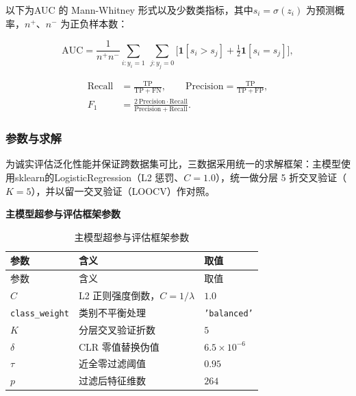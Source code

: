 \documentclass{../../latex/templates/mcm-paper}
\begin{document}
以下为AUC 的 Mann-Whitney 形式以及少数类指标，其中$s_i=\sigma(z_i)$ 为预测概率，$n^{+}$、$n^{-}$ 为正负样本数：

\begin{equation}
\mathrm{AUC} = \frac{1}{n^{+}n^{-}}
  \sum_{i:y_i=1}\ \sum_{j:y_j=0}
  \Big[ \mathbf{1}[s_i > s_j] + \tfrac{1}{2}\mathbf{1}[s_i = s_j] \Big],
\label{eq:s1-auc}
\end{equation}

\begin{equation}
\begin{aligned}
  \mathrm{Recall} &= \frac{\mathrm{TP}}{\mathrm{TP}+\mathrm{FN}},
  \qquad
  \mathrm{Precision} = \frac{\mathrm{TP}}{\mathrm{TP}+\mathrm{FP}}, \\
  F_1 &= \frac{2\,\mathrm{Precision}\cdot\mathrm{Recall}}{\mathrm{Precision}+\mathrm{Recall}}.
\end{aligned}
\label{eq:s1-metrics}
\end{equation}

\subsubsection{参数与求解}
\label{sec:s1-solving}

为诚实评估泛化性能并保证跨数据集可比，三数据采用统一的求解框架：主模型使用sklearn的LogisticRegression（L2 惩罚、$C=1.0$），统一做分层 5 折交叉验证（$K=5$），并以留一交叉验证（LOOCV）作对照。

\textbf{主模型超参与评估框架参数}

{\small
\begin{longtable}{>{\centering\arraybackslash}p{}>{\centering\arraybackslash}p{}>{\centering\arraybackslash}p{}}
\caption{主模型超参与评估框架参数}\label{tab:s1-params}\\
\toprule
参数 & 含义 & 取值 \\
\midrule
\endfirsthead
\toprule
参数 & 含义 & 取值 \\
\midrule
\endhead
\bottomrule
\endlastfoot
$C$ & L2 正则强度倒数，$C=1/\lambda$ & $1.0$ \\
\texttt{class\_weight} & 类别不平衡处理 & \texttt{'balanced'} \\
$K$ & 分层交叉验证折数 & $5$ \\
$\delta$ & CLR 零值替换伪值 & $6.5\times10^{-6}$ \\
$\tau$ & 近全零过滤阈值 & $0.95$ \\
$p$ & 过滤后特征维数 & $264$ \\
\end{longtable}
}
\end{document}
